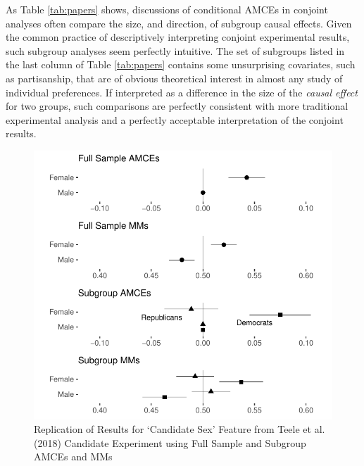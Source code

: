 \documentclass[a4paper,12pt]{article}\usepackage[]{graphicx}\usepackage[]{color}
\makeatletter
\def\maxwidth{ %
  \ifdim\Gin@nat@width>\linewidth
    \linewidth
  \else
    \Gin@nat@width
  \fi
}
\newenvironment{knitrout}{}{} %
\makeatother
\begin{document}
As Table \ref{tab:papers} shows, discussions of conditional AMCEs in conjoint analyses often compare the size, and direction, of subgroup causal effects. Given the common practice of descriptively interpreting conjoint experimental results, such subgroup analyses seem perfectly intuitive. The set of subgroups listed in the last column of Table \ref{tab:papers} contains some unsurprising covariates, such as partisanship, that are of obvious theoretical interest in almost any study of individual preferences. If interpreted as a difference in the size of the \textit{causal effect} for two groups, such comparisons are perfectly consistent with more traditional experimental analysis and a perfectly acceptable interpretation of the conjoint results.

\begin{knitrout}
\color{fgcolor}\begin{figure}
\includegraphics[width=\maxwidth]{figure/tkr_replication-1} \caption[Replication of Results for `Candidate Sex' Feature from Teele et al]{Replication of Results for `Candidate Sex' Feature from Teele et al. (2018) Candidate Experiment using Full Sample and Subgroup AMCEs and MMs}\label{fig:tkr_replication}
\end{figure}


\end{knitrout}
\end{document}
